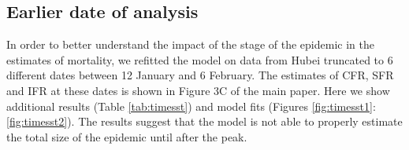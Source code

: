 \documentclass{article}
\begin{document}
%

\clearpage
\subsection{Earlier date of analysis}

In order to better understand the impact of the stage of the epidemic in the estimates of mortality, we refitted the model on data from Hubei truncated to 6 different dates between 12 January and 6 February. 
The estimates of CFR, SFR and IFR at these dates is shown in Figure 3C of the main paper.
Here we show additional results (Table \ref{tab:timesst}) and model fits (Figures \ref{fig:timesst1}:\ref{fig:timesst2}).
The results suggest that the model is not able to properly estimate the total size of the epidemic until after the peak.
\end{document}
